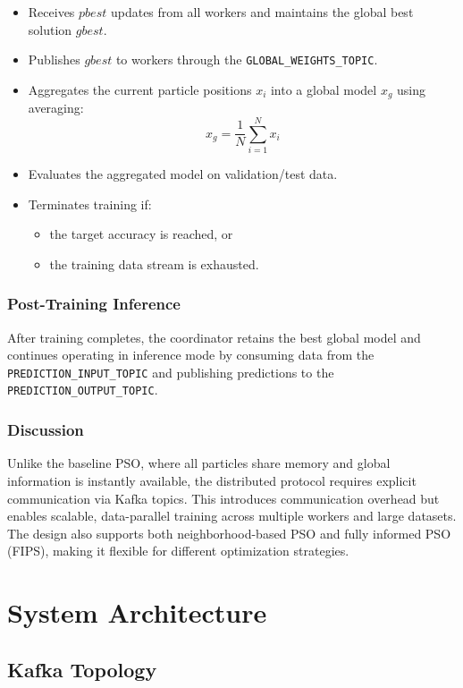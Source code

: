 \begin{itemize}
    \item Receives $pbest$ updates from all workers and maintains the global best solution $gbest$.
    \item Publishes $gbest$ to workers through the \texttt{GLOBAL\_WEIGHTS\_TOPIC}.
    \item Aggregates the current particle positions $x_i$ into a global model $x_g$ using averaging:
    \[
    x_g = \frac{1}{N} \sum_{i=1}^{N} x_i
    \]
    \item Evaluates the aggregated model on validation/test data.
    \item Terminates training if:
    \begin{itemize}
        \item the target accuracy is reached, or
        \item the training data stream is exhausted.
    \end{itemize}
\end{itemize}

\subsubsection{Post-Training Inference}

After training completes, the coordinator retains the best global model and continues operating in inference mode by consuming data from the \texttt{PREDICTION\_INPUT\_TOPIC} and publishing predictions to the \texttt{PREDICTION\_OUTPUT\_TOPIC}.

\subsubsection{Discussion}

Unlike the baseline PSO, where all particles share memory and global information is instantly available, the distributed protocol requires explicit communication via Kafka topics. This introduces communication overhead but enables scalable, data-parallel training across multiple workers and large datasets. The design also supports both neighborhood-based PSO and fully informed PSO (FIPS), making it flexible for different optimization strategies.

\section{System Architecture}
\subsection{Kafka Topology}

